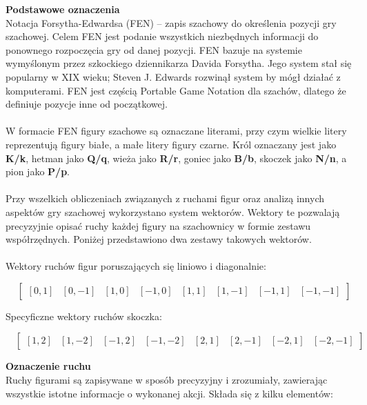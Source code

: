 \documentclass[twoside]{projektInzynierskiMS1}
\begin{document}
\noindent \textbf{Podstawowe oznaczenia}\\
Notacja Forsytha-Edwardsa (FEN) – zapis szachowy do określenia pozycji gry szachowej. Celem FEN jest podanie wszystkich niezbędnych informacji do ponownego rozpoczęcia gry od danej pozycji. FEN bazuje na systemie wymyślonym przez szkockiego dziennikarza Davida Forsytha. Jego system stał się popularny w XIX wieku; Steven J. Edwards rozwinął system by mógł działać z komputerami. FEN jest częścią Portable Game Notation dla szachów, dlatego że definiuje pozycje inne od początkowej.
\\\\
W formacie FEN figury szachowe są oznaczane literami, przy czym wielkie litery reprezentują figury białe, a małe litery figury czarne. Król oznaczany jest jako \textbf{K/k}, hetman jako \textbf{Q/q}, wieża jako \textbf{R/r}, goniec jako \textbf{B/b}, skoczek jako \textbf{N/n}, a pion jako \textbf{P/p}.
\\\\
Przy wszelkich obliczeniach związanych z ruchami figur oraz analizą innych aspektów gry szachowej wykorzystano system wektorów. Wektory te pozwalają precyzyjnie opisać ruchy każdej figury na szachownicy w formie zestawu współrzędnych. Poniżej przedstawiono dwa zestawy takowych wektorów.
\\\\
Wektory ruchów figur poruszających się liniowo i diagonalnie:

\[ \quad 
\begin{bmatrix}
    [0, 1] & [0, -1] & [1, 0] & [-1, 0] & [1, 1] & [1, -1] & [-1, 1] & [-1, -1]
\end{bmatrix}
\]

\noindent
Specyficzne wektory ruchów skoczka:

\[ \quad 
\begin{bmatrix}
    [1, 2] & [1, -2] & [-1, 2] & [-1, -2] & [2, 1] & [2, -1] & [-2, 1] & [-2, -1]
\end{bmatrix}
\]

\newpage

\noindent \textbf{Oznaczenie ruchu}\\
Ruchy figurami są zapisywane w sposób precyzyjny i zrozumiały, zawierając wszystkie istotne informacje o wykonanej akcji. Składa się z kilku elementów:
\end{document}
